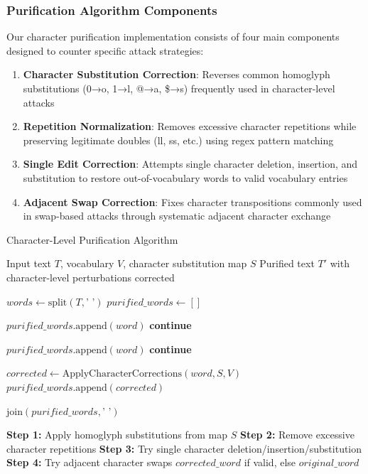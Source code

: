 \documentclass[../main.tex]{subfiles}
\begin{document}
\subsubsection{Purification Algorithm Components}

Our character purification implementation consists of four main components designed to counter specific attack strategies:

\begin{enumerate}
\item \textbf{Character Substitution Correction}: Reverses common homoglyph substitutions (0→o, 1→l, @→a, \$→s) frequently used in character-level attacks
\item \textbf{Repetition Normalization}: Removes excessive character repetitions while preserving legitimate doubles (ll, ss, etc.) using regex pattern matching
\item \textbf{Single Edit Correction}: Attempts single character deletion, insertion, and substitution to restore out-of-vocabulary words to valid vocabulary entries
\item \textbf{Adjacent Swap Correction}: Fixes character transpositions commonly used in swap-based attacks through systematic adjacent character exchange
\end{enumerate}

\begin{breakablealgorithm}{Character-Level Purification Algorithm}
\begin{algorithmic}[1]
\Require Input text $T$, vocabulary $V$, character substitution map $S$
\Ensure Purified text $T'$ with character-level perturbations corrected

    \State $words \gets \text{split}(T, \text{' '})$ 
    \State $purified\_words \gets []$
    
            \State $purified\_words.\text{append}(word)$ 
            \State \textbf{continue}
        \EndIf
        
            \State $purified\_words.\text{append}(word)$ 
            \State \textbf{continue}
        \EndIf
        
        \State $corrected \gets \text{ApplyCharacterCorrections}(word, S, V)$
        \State $purified\_words.\text{append}(corrected)$
    \EndFor
    
    \State \Return $\text{join}(purified\_words, \text{' '})$
\EndFunction

    \State \textbf{Step 1:} Apply homoglyph substitutions from map $S$
    \State \textbf{Step 2:} Remove excessive character repetitions
    \State \textbf{Step 3:} Try single character deletion/insertion/substitution
    \State \textbf{Step 4:} Try adjacent character swaps
    \State \Return $corrected\_word$ if valid, else $original\_word$
\EndFunction
\end{algorithmic}
\end{breakablealgorithm}
\end{document}
